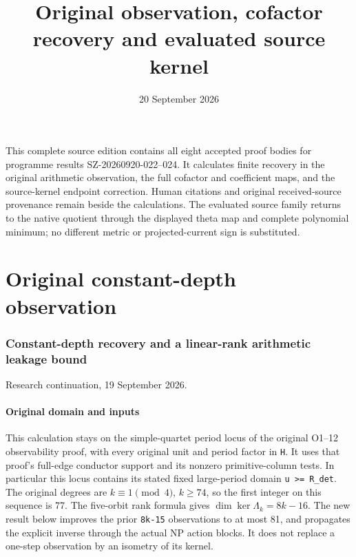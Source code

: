 \documentclass[11pt]{article}
\title{Original observation, cofactor recovery and evaluated source kernel}
\author{}
\date{20 September 2026}
\begin{document}
\maketitle
This complete source edition contains all eight accepted proof bodies
for programme results SZ-20260920-022--024. It calculates finite
recovery in the original arithmetic observation, the full cofactor
and coefficient maps, and the source-kernel endpoint correction.
Human citations and original received-source provenance remain beside
the calculations. The evaluated source family returns to the native
quotient through the displayed theta map and complete polynomial
minimum; no different metric or projected-current sign is substituted.


\clearpage\begingroup
\part*{Original constant-depth observation}
\providecommand{\pdepthtightlist}{\setlength{\itemsep}{0pt}\setlength{\parskip}{0pt}}
\newcommand{\pdepthdiag}{\operatorname{diag}}
\newcommand{\pdepthrank}{\operatorname{rank}}
\newcommand{\pdepthTr}{\operatorname{Tr}}

\section{Constant-depth recovery and a linear-rank arithmetic leakage bound}\label{pdepth:constant-depth-recovery-and-a-linear-rank-arithmetic-leakage-bound}

Research continuation, 19 September 2026.

\subsection{Original domain and inputs}\label{pdepth:original-domain-and-inputs}

This calculation stays on the simple-quartet period locus of the original O1--12 observability proof, with every original unit and period factor in \texttt{H}. It uses that proof's full-edge conductor support and its nonzero primitive-column tests. In particular this locus contains its stated fixed large-period domain \texttt{\textbar{}u\textbar{}\ \textgreater{}=\ R\_det}. The original degrees are \(k\equiv1\pmod4\), \(k\ge74\), so the first integer on this sequence is 77. The five-orbit rank formula gives \(\dim\ker\Lambda_k=8k-16\). The new result below improves the prior \texttt{8k-15} observations to at most 81, and propagates the explicit inverse through the actual NP action blocks. It does not replace a one-step observation by an isometry of its kernel.
\end{document}
